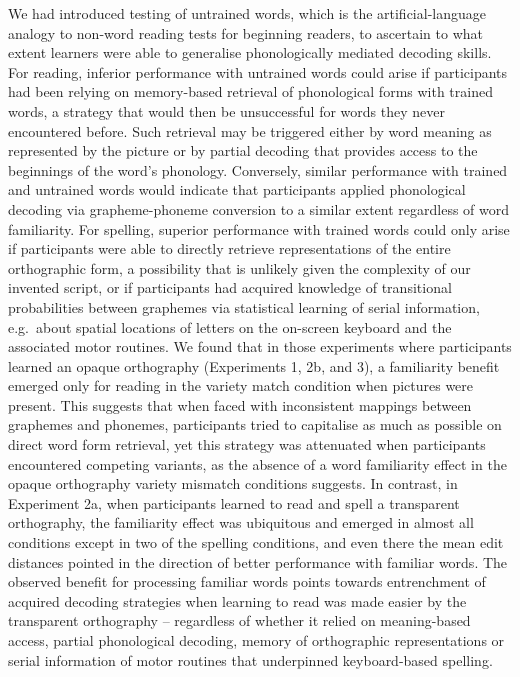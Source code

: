 \documentclass[doc,floatsintext]{apa6}
\begin{document}
We had introduced testing of untrained words, which is the
artificial-language analogy to non-word reading tests for beginning
readers, to ascertain to what extent learners were able to generalise
phonologically mediated decoding skills. For reading, inferior
performance with untrained words could arise if participants had been
relying on memory-based retrieval of phonological forms with trained
words, a strategy that would then be unsuccessful for words they never
encountered before. Such retrieval may be triggered either by word
meaning as represented by the picture or by partial decoding that
provides access to the beginnings of the word's phonology. Conversely,
similar performance with trained and untrained words would indicate that
participants applied phonological decoding via grapheme-phoneme
conversion to a similar extent regardless of word familiarity. For
spelling, superior performance with trained words could only arise if
participants were able to directly retrieve representations of the
entire orthographic form, a possibility that is unlikely given the
complexity of our invented script, or if participants had acquired
knowledge of transitional probabilities between graphemes via
statistical learning of serial information, e.g.~about spatial locations
of letters on the on-screen keyboard and the associated motor routines.
We found that in those experiments where participants learned an opaque
orthography (Experiments 1, 2b, and 3), a familiarity benefit emerged
only for reading in the variety match condition when pictures were
present. This suggests that when faced with inconsistent mappings
between graphemes and phonemes, participants tried to capitalise as much
as possible on direct word form retrieval, yet this strategy was
attenuated when participants encountered competing variants, as the
absence of a word familiarity effect in the opaque orthography variety
mismatch conditions suggests. In contrast, in Experiment 2a, when
participants learned to read and spell a transparent orthography, the
familiarity effect was ubiquitous and emerged in almost all conditions
except in two of the spelling conditions, and even there the mean edit
distances pointed in the direction of better performance with familiar
words. The observed benefit for processing familiar words points towards
entrenchment of acquired decoding strategies when learning to read was
made easier by the transparent orthography -- regardless of whether it
relied on meaning-based access, partial phonological decoding, memory of
orthographic representations or serial information of motor routines
that underpinned keyboard-based spelling.
\end{document}

